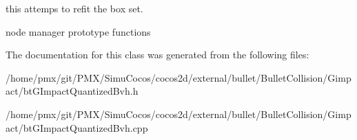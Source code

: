 this attemps to refit the box set. 

node manager prototype functions 

The documentation for this class was generated from the following files\+:\begin{DoxyCompactItemize}
\item 
/home/pmx/git/\+P\+M\+X/\+Simu\+Cocos/cocos2d/external/bullet/\+Bullet\+Collision/\+Gimpact/bt\+G\+Impact\+Quantized\+Bvh.\+h\item 
/home/pmx/git/\+P\+M\+X/\+Simu\+Cocos/cocos2d/external/bullet/\+Bullet\+Collision/\+Gimpact/bt\+G\+Impact\+Quantized\+Bvh.\+cpp\end{DoxyCompactItemize}
